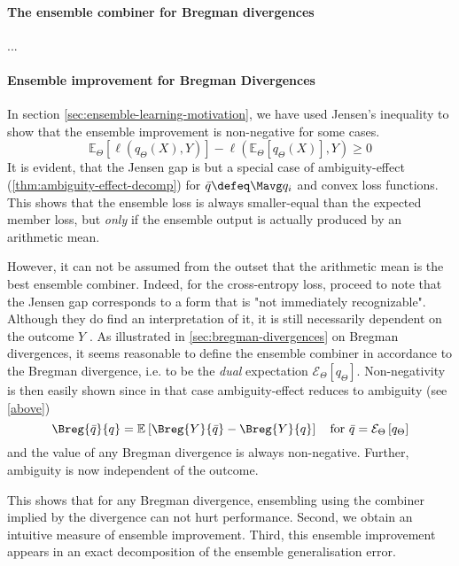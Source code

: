 \documentclass[../main.tex]{subfiles}
\begin{document}
\paragraph{The ensemble combiner for Bregman divergences} ...


\paragraph{Ensemble improvement for Bregman Divergences}

In section \ref{sec:ensemble-learning-motivation}, we have used Jensen's inequality to show that the ensemble improvement is non-negative for some cases.
$$
\mathbb{E}_{{\Theta}}\left[ \ell (q_{\Theta}(X),Y) \right]  -
\ell(\mathbb{E}_{\Theta}\left[ q_{\Theta}(X) \right] ,Y ) \geq 0
$$
It is evident, that the Jensen gap is but a special case of ambiguity-effect (\ref{thm:ambiguity-effect-decomp}) for $\bar{q} \defeq \Mavg q_{i}$ and convex loss functions. 
This shows that the ensemble loss is always smaller-equal than the expected member loss, but \textit{only} if the ensemble output is actually produced by an arithmetic mean. 

However, it can not be assumed from the outset that the arithmetic mean is the best ensemble combiner. Indeed, for the cross-entropy loss, \citeauthor{abe} proceed to note that the Jensen gap corresponds to a form that is "not immediately recognizable". Although they do find an interpretation of it, it is still necessarily dependent on the outcome $Y$ 
.
As illustrated in \ref{sec:bregman-divergences} on Bregman divergences, 
it seems reasonable to define the ensemble combiner in accordance to the Bregman divergence, i.e. to be the \textit{dual} expectation $\mathcal{E}_{\Theta}\left[ q_{\Theta} \right]$. 
Non-negativity is then easily shown since in that case ambiguity-effect reduces to ambiguity (see \ref{above})
$$
\Breg{\bar{q}}{q} = \mathbb{E}_{}\left[ \Breg{Y}{\bar{q}} - \Breg{Y}{q} \right]
\hspace{1em} \text{for $\bar{q} = \mathcal{E}_\Theta\left[q_\Theta\right]$}
$$ and the value of any Bregman divergence is always non-negative. Further, ambiguity is now independent of the outcome.

This shows that for any Bregman divergence, ensembling using the combiner implied by the divergence can not hurt performance. Second, we obtain an intuitive measure of ensemble improvement. Third, this ensemble improvement appears in an exact decomposition of the ensemble generalisation error.




\end{document}
